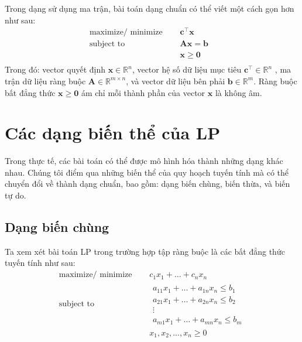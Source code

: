 Trong dạng sử dụng ma trận, bài toán dạng chuẩn có thể viết một cách gọn hơn như sau:
\begin{equation}
    \begin{aligned}
    \text{maximize/ minimize } \quad & \mathbf{c}^{\top}\mathbf{x} & \\ 
    \text{subject to }\quad & \mathbf{Ax} = \mathbf{b} \\
    \quad& \mathbf{x} \geq \mathbf{0}\\
    \end{aligned}
\end{equation}
Trong đó: vector quyết định $\mathbf{x} \in \mathbb{R}^n$, vector hệ số dữ liệu mục tiêu $\mathbf{c}^{\top} \in \mathbb{R}^n$ , ma trận dữ liệu ràng buộc $\mathbf{A} \in \mathbb{R}^{m \times n}$, và vector dữ liệu bên phải $\mathbf{b} \in \mathbb{R}^{m}$. Ràng buộc bất đẳng thức $\mathbf{x} \geq \mathbf{0}$ ám chỉ mỗi thành phần của vector $\mathbf{x}$ là không âm.

\section{Các dạng biến thể của LP}

Trong thực tế, các bài toán có thể được mô hình hóa thành những dạng khác nhau. Chúng tôi điểm qua những biến thể của quy hoạch tuyến tính mà có thể chuyển đổi về thành dạng chuẩn, bao gồm: dạng biến chùng, biến thừa, và biến tự do.

\subsection{Dạng biến chùng}

Ta xem xét bài toán LP trong trường hợp tập ràng buộc là các bất đẳng thức tuyến tính như sau:
\begin{equation}
    \label{eq:slack_var}
    \begin{aligned}
        \text{maximize/ minimize } \quad & c_1 x_1 + \dots + c_n x_n \\
        \text{subject to }\quad &
            \begin{array}{c}
            a_{11} x_1 + \dots + a_{1n} x_n \leq b_1 \\
            a_{21} x_1 + \dots + a_{2n} x_n \leq b_2 \\
            \vdots \\
            a_{m1} x_1 + \dots + a_{mn} x_n \leq b_m 
            \end{array} \\ 
            \quad & x_1, x_2, ..., x_n \geq 0 \\
    \end{aligned}   
\end{equation}

